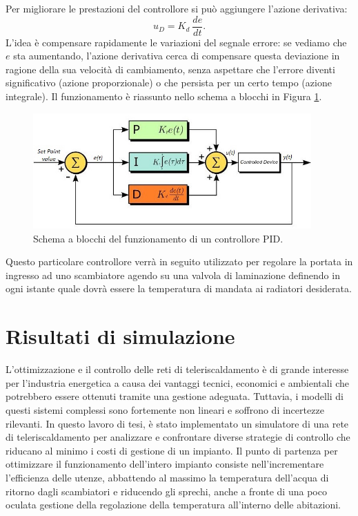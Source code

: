 \documentclass[laurea,oneside,11pt]{USiena_tesiLM3}
\begin{document}
Per migliorare le prestazioni del controllore si può aggiungere l'azione derivativa:
\begin{equation}
u_D = K_d \ \dfrac{de}{dt}  .
\end{equation}
L'idea è compensare rapidamente le variazioni del segnale errore: se vediamo che $e$ sta aumentando, l'azione derivativa cerca di compensare questa deviazione in ragione della sua velocità di cambiamento, senza aspettare che l'errore diventi significativo (azione proporzionale) o che persista per un certo tempo (azione integrale).
Il funzionamento è riassunto nello  schema a blocchi in Figura \ref{fig:PID2}.

\begin{figure}[!ht]
\centering
\includegraphics[width=0.95\textwidth]{figure/PID2} 
\caption{Schema a blocchi del funzionamento di un controllore PID.}
\label{fig:PID2}
\end{figure}

Questo particolare controllore verrà in seguito utilizzato per regolare la portata in ingresso ad uno scambiatore agendo su una valvola di laminazione definendo in ogni istante quale dovrà essere la temperatura di mandata ai radiatori desiderata.

\chapter{Risultati di simulazione}
L'ottimizzazione e il controllo delle reti di teleriscaldamento è di grande interesse per l'industria energetica a causa dei vantaggi tecnici, economici e ambientali che potrebbero essere ottenuti tramite una gestione adeguata. Tuttavia, i modelli di questi sistemi complessi sono fortemente non lineari  e soffrono di incertezze rilevanti. In questo lavoro di tesi, è stato implementato un simulatore di una rete di teleriscaldamento per analizzare e confrontare diverse strategie di controllo che riducano al minimo i costi di gestione di un impianto.
Il punto di partenza per ottimizzare il funzionamento dell'intero impianto consiste nell'incrementare l'efficienza delle utenze, abbattendo al massimo la temperatura dell'acqua di ritorno dagli scambiatori 
e riducendo gli sprechi, anche a fronte di una poco oculata gestione della regolazione della temperatura all'interno delle abitazioni.
\end{document}
